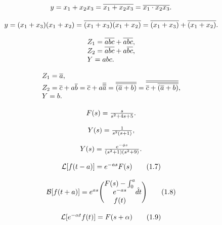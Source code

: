 \documentclass{article}
\begin{document}
\[
$$
y=x_{1}+x_{2} x_{3}=\overline{{x_{1}+x_{2} x_{3}}}=\overline{{x_{1} \cdot x_{2} x_{3}}}.
$$
\]

\[
$$
y=( x_{1}+x_{3} ) ( x_{1}+x_{2} )=\overline{{( x_{1}+x_{3} ) ( x_{1}+x_{2} )}}=\overline{{( x_{1}+x_{3} )}}+\overline{{( x_{1}+x_{2} )}}.
$$
\]

\[
$$
\begin{array} {l} {Z_{1}=\overline{{a b c}}+\overline{{a b c}},} \\ {Z_{2}=\overline{{a b c}}+a \overline{{b c}},} \\ {Y=a b c.} \\ \end{array}
$$
\]

\[
$$
\begin{array} {l} {Z_{1}=\overline{{a}},} \\ {Z_{2}=\overline{{c}}+a \overline{{b}}=\overline{{c}}+a \overline{{\overline{{\overline{{a}}}}}}=\overline{{\overline{{( \overline{{a}}+b )}}}}=\overline{{\overline{{\overline{{c}}+\overline{{( \overline{{a}}+b )}}}}}},} \\ {Y=b.} \\ \end{array}
$$
\]

\[
$$
F ( s )=\frac{s} {s^{2}+4 s+5}.
$$
\]

\[
$$
Y ( s )={\frac{1} {s^{2} ( s+1 )}},
$$
\]

\[
$$
Y ( s )={\frac{e^{-\phi s}} {( s^{2}+1 ) ( s^{2}+9 )}}.
$$
\]

\[
$$
{\mathcal{L}} [ f ( t-a ) ]=e^{-a s} F ( s ) \tag{1.7}
$$
\]

\[
$$
{\cal B} [ f ( t+a ) ]=e^{a s} \Biggl( \begin{matrix} {F ( s )-\int_{0}^{a}} \\ {e^{-a s}} \\ {f ( t )} \\ \end{matrix} \hat{d} t \Biggr) \tag{1.8}
$$
\]

\[
$$
{\mathcal{L}} [ e^{-\alpha t} f ( t ) ]=F ( s+\alpha) \tag{1.9}
$$
\]
\end{document}
